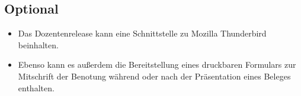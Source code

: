 \documentclass{article}
\begin{document}
\subsection{Optional}
\begin{itemize}
\item Das Dozentenrelease kann eine Schnittstelle zu Mozilla Thunderbird beinhalten.

\item Ebenso kann es außerdem die Bereitstellung eines druckbaren Formulars 
zur Mitschrift der Benotung während oder nach der Präsentation eines Beleges enthalten.\\
\end{itemize}
\end{document}
